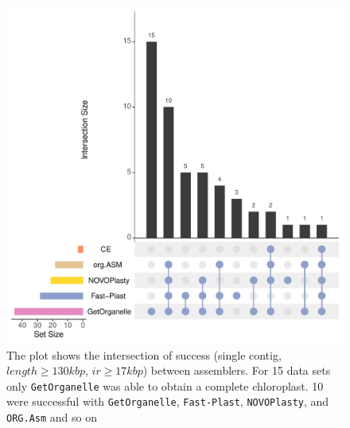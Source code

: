 \documentclass{bmcart}
\newcommand{\formatprogramnames}[1]{\texttt{#1}}
\newcommand{\oa}{\formatprogramnames{ORG.Asm}}
\newcommand{\fp}{\formatprogramnames{Fast-Plast}}
\newcommand{\np}{\formatprogramnames{NOVOPlasty}}
\newcommand{\go}{\formatprogramnames{GetOrganelle}}
\begin{document}
\begin{backmatter}
\begin{figure}[h!]
  \includegraphics[width=\textwidth]{manuscript/plots/upset_novel.pdf}
  \caption{
      The plot shows the intersection of success (single contig, $length \ge 130kbp$, $ir \ge 17kbp$) between assemblers. For \num{15} data sets only \go{} was able to obtain a complete chloroplast. \num{10} were successful with \go{}, \fp{}, \np{}, and \oa{} and so on}
      \label{fig:upset_novel}
      \end{figure}


\end{backmatter}
\end{document}
